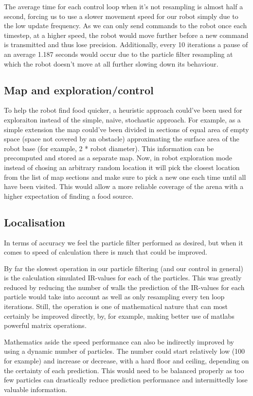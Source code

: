 \documentclass[paper=a4, fontsize=12pt]{scrartcl}	%
\numberwithin{equation}{section}		%
\numberwithin{figure}{section}			%
\numberwithin{table}{section}				%
\begin{document}
The average time for each control loop when it's not resampling is almost half a second, forcing us to use a slower movement speed for our robot simply due to the low update frequency. As we can only send commands to the robot once each timestep, at a higher speed, the robot would move further before a new command is transmitted and thus lose precision. Additionally, every 10 iterations a pause of an average 1.187 seconds would occur due to the particle filter resampling at which the robot doesn't move at all further slowing down its behaviour.

\subsection{Map and exploration/control}
To help the robot find food quicker, a heuristic approach could've been used for exploraiton instead of the simple, naive, stochastic approach. For example, as a simple extension the map could've been divided in sections of equal area of empty space (space not covered by an obstacle) approximating the surface area of the robot base (for example, 2 * robot diameter). This information can be precomputed and stored as a separate map. Now, in robot exploration mode instead of chosing an arbitrary random location it will pick the closest location from the list of map sections and make sure to pick a new one each time until all have been visited. This would allow a more reliable coverage of the arena with a higher expectation of finding a food source.

\subsection{Localisation}
In terms of accuracy we feel the particle filter performed as desired, but when it comes to speed of calculation there is much that could be improved.

By far the slowest operation in our particle filtering (and our control in general) is the calculation simulated IR-values for each of the particles. This was greatly reduced by reducing the number of walls the prediction of the IR-values for each particle would take into account as well as only resampling every ten loop iterations. Still, the operation is one of mathematical nature that can most certainly be improved directly, by, for example, making better use of matlabs powerful matrix operations.

Mathematics aside the speed performance can also be indirectly improved by using a dynamic number of particles. The number could start relatively low (100 for example) and increase or decrease, with a hard floor and ceiling, depending on the certainty of each prediction. This would need to be balanced properly as too few particles can drastically reduce prediction performance and intermittedly lose valuable information.
\end{document}
